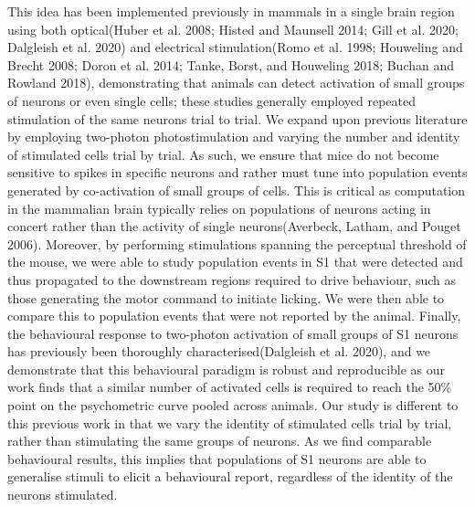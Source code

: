 This idea has been implemented previously in mammals in a single brain region using both optical(Huber et al. 2008; Histed and Maunsell 2014; Gill et al. 2020; Dalgleish et al. 2020) and electrical stimulation(Romo et al. 1998; Houweling and Brecht 2008; Doron et al. 2014; Tanke, Borst, and Houweling 2018; Buchan and Rowland 2018), demonstrating that animals can detect activation of small groups of neurons or even single cells; these studies generally employed repeated stimulation of the same neurons trial to trial. We expand upon previous literature by employing two-photon photostimulation and varying the number and identity of stimulated cells trial by trial. As such, we ensure that mice do not become sensitive to spikes in specific neurons and rather must tune into population events generated by co-activation of small groups of cells. This is critical as computation in the mammalian brain typically relies on populations of neurons acting in concert rather than the activity of single neurons(Averbeck, Latham, and Pouget 2006). Moreover, by performing stimulations spanning the perceptual threshold of the mouse, we were able to study population events in S1 that were detected and thus propagated to the downstream regions required to drive behaviour, such as those generating the motor command to initiate licking. We were then able to compare this to population events that were not reported by the animal. Finally, the behavioural response to two-photon activation of small groups of  S1 neurons has previously been thoroughly characterised(Dalgleish et al. 2020), and we demonstrate that this behavioural paradigm is robust and reproducible as our work finds that a similar number of activated cells is required to reach the 50\% point on the psychometric curve pooled across animals. Our study is different to this previous work in that we vary the identity of stimulated cells trial by trial, rather than stimulating the same groups of neurons. As we find comparable behavioural results, this implies that populations of S1 neurons are able to generalise stimuli to elicit a behavioural report, regardless of the identity of the neurons stimulated.

